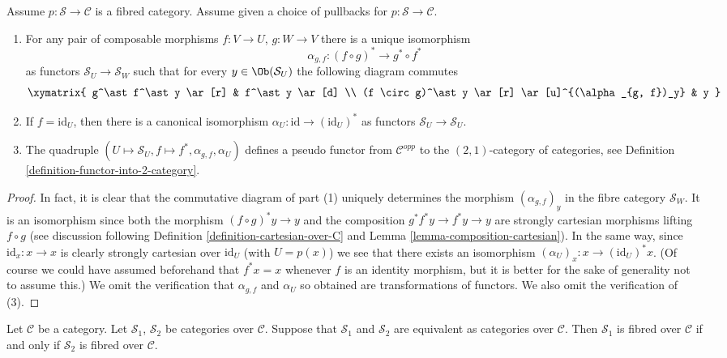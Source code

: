 \begin{lemma}
\label{lemma-fibred}
Assume $p : \mathcal{S} \to \mathcal{C}$ is a fibred category.
Assume given a choice of pullbacks for $p : \mathcal{S} \to \mathcal{C}$.
\begin{enumerate}
\item For any pair of composable morphisms $f : V \to U$,
$g : W \to V$ there is a unique isomorphism
$$
\alpha_{g, f} :
(f \circ g)^\ast
\longrightarrow
g^\ast \circ f^\ast
$$
as functors $\mathcal{S}_U \to \mathcal{S}_W$
such that for every $y\in \Ob(\mathcal{S}_U)$ the following
diagram commutes
$$
\xymatrix{
g^\ast f^\ast y \ar[r]
&
f^\ast y \ar[d] \\
(f \circ g)^\ast y \ar[r]
\ar[u]^{(\alpha_{g, f})_y}
&
y
}
$$
\item If $f = \text{id}_U$, then there is a canonical isomorphism
$\alpha_U : \text{id} \to (\text{id}_U)^*$ as functors
$\mathcal{S}_U \to \mathcal{S}_U$.
\item The quadruple
$(U \mapsto \mathcal{S}_U, f \mapsto f^*, \alpha_{g, f}, \alpha_U)$
defines a pseudo functor from $\mathcal{C}^{opp}$ to
the $(2, 1)$-category of categories, see
Definition \ref{definition-functor-into-2-category}.
\end{enumerate}
\end{lemma}

\begin{proof}
In fact, it is clear that the commutative diagram of
part (1) uniquely determines the morphism
$(\alpha_{g, f})_y$ in the fibre category
$\mathcal{S}_W$. It is an isomorphism since both
the morphism $(f \circ g)^*y \to y$
and the composition $g^*f^*y \to f^*y \to y$ are strongly
cartesian morphisms lifting $f \circ g$ (see discussion
following Definition \ref{definition-cartesian-over-C} and
Lemma \ref{lemma-composition-cartesian}). In the same way,
since $\text{id}_x : x \to x$ is clearly strongly cartesian
over $\text{id}_U$ (with $U = p(x)$) we see that there exists
an isomorphism $(\alpha_U)_x : x \to (\text{id}_U)^*x$.
(Of course we could have assumed beforehand that $f^*x = x$
whenever $f$ is an identity morphism, but it is better for
the sake of generality not to assume this.)
We omit the verification that $\alpha_{g, f}$ and
$\alpha_U$ so obtained are transformations of functors.
We also omit the verification of (3).
\end{proof}

\begin{lemma}
\label{lemma-fibred-equivalent}
Let $\mathcal{C}$ be a category.
Let $\mathcal{S}_1$, $\mathcal{S}_2$ be categories over $\mathcal{C}$.
Suppose that $\mathcal{S}_1$ and $\mathcal{S}_2$ are equivalent
as categories over $\mathcal{C}$.
Then $\mathcal{S}_1$ is fibred over $\mathcal{C}$ if and only if
$\mathcal{S}_2$ is fibred over $\mathcal{C}$.
\end{lemma}

